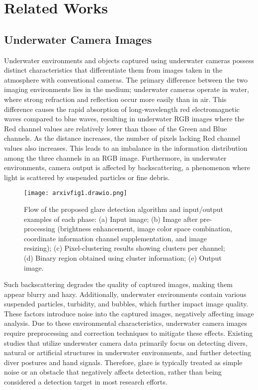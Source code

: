 \section{Related Works}
\subsection{Underwater Camera Images}
Underwater environments and objects captured using underwater cameras possess distinct characteristics that differentiate them from images taken in the atmosphere with conventional cameras.
The primary difference between the two imaging environments lies in the medium; underwater cameras operate in water, where strong refraction and reflection occur more easily than in air.
This difference causes the rapid absorption of long-wavelength red electromagnetic waves compared to blue waves, resulting in underwater RGB images where the Red channel values are relatively lower than those of the Green and Blue channels. As the distance increases, the number of pixels lacking Red channel values also increases.
This leads to an imbalance in the information distribution among the three channels in an RGB image.
Furthermore, in underwater environments, camera output is affected by backscattering, a phenomenon where light is scattered by suspended particles or fine debris.
\begin{figure*}[ht]
    \centering
    \texttt{[image: arxivfig1.drawio.png]}
    \caption{Flow of the proposed glare detection algorithm and input/output examples of each phase: (a) Input image; (b) Image after pre-processing (brightness enhancement, image color space combination, coordinate information channel supplementation, and image resizing); (c) Pixel-clustering results showing clusters per channel; (d) Binary region obtained using cluster information; (e) Output image.}
    \label{fig}
\end{figure*}
Such backscattering degrades the quality of captured images, making them appear blurry and hazy.
Additionally, underwater environments contain various suspended particles, turbidity, and bubbles, which further impact image quality.
These factors introduce noise into the captured images, negatively affecting image analysis.
Due to these environmental characteristics, underwater camera images require preprocessing and correction techniques to mitigate these effects.
Existing studies that utilize underwater camera data primarily focus on detecting divers, natural or artificial structures in underwater environments, and further detecting diver postures and hand signals.
Therefore, glare is typically treated as simple noise or an obstacle that negatively affects detection, rather than being considered a detection target in most research efforts.

